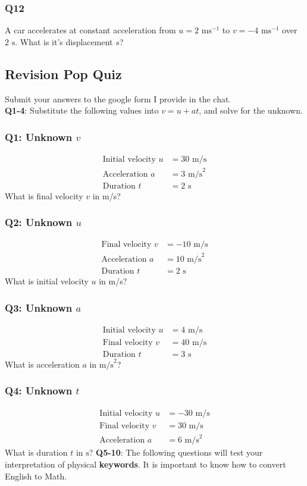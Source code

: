 \documentclass{article}
\begin{document}
\subsubsection{Q12}
A car accelerates at constant acceleration from $u=2\text{ ms}^{-1}$ to $v=-4\text{ ms}^{-1}$ over $2\text{ s}$. What is it's displacement $s$?\\[50pt]
\subsection{Revision Pop Quiz}
Submit your answers to the google form I provide in the chat.\\[20pt]

\noindent \textbf{Q1-4}: Substitute the following values into $v=u+at$, and solve for the unknown.
\subsubsection{Q1: Unknown $v$}
\begin{align}
\text{Initial velocity } u&=30 \text{ m/s}\\
\text{Acceleration }a&=3 \text{ m/s}^2\\
\text{Duration }t&=2 \text{ s}
\end{align}
What is final velocity $v$ in m/s? 
\subsubsection{Q2: Unknown $u$}
\begin{align}
\text{Final velocity } v&=-10 \text{ m/s}\\
\text{Acceleration }a&=10 \text{ m/s}^2\\
\text{Duration }t&=2 \text{ s}
\end{align}
What is initial velocity $u$ in m/s? 
\subsubsection{Q3: Unknown $a$}
\begin{align}
\text{Initial velocity } u&=4 \text{ m/s}\\
\text{Final velocity }v&=40 \text{ m/s}\\
\text{Duration }t&=3 \text{ s}
\end{align}
What is acceleration $a$ in $\text{m/s}^2$? 
\subsubsection{Q4: Unknown $t$}
\begin{align}
\text{Initial velocity } u&=-30 \text{ m/s}\\
\text{Final velocity }v&=30 \text{ m/s}\\
\text{Acceleration }a&=6 \text{ m/s}^2
\end{align}
What is duration $t$ in $\text{s}$? \clearpage
\noindent \textbf{Q5-10}: The following questions will test your interpretation of physical \textbf{keywords}. It is important to know how to convert English to Math.
\end{document}
